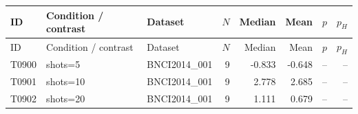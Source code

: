 \begin{longtable}{p{.45in}p{2.6in}p{.75in}rrrrr}
\toprule
ID & Condition / contrast & Dataset & $N$ & Median & Mean & $p$ & $p_H$ \\
\midrule
\endfirsthead
\toprule
ID & Condition / contrast & Dataset & $N$ & Median & Mean & $p$ & $p_H$ \\
\midrule
\endhead
T0900 & shots=5 & BNCI2014\_\allowbreak{}001 & 9 & -0.833 & -0.648 & -- & -- \\
T0901 & shots=10 & BNCI2014\_\allowbreak{}001 & 9 & 2.778 & 2.685 & -- & -- \\
T0902 & shots=20 & BNCI2014\_\allowbreak{}001 & 9 & 1.111 & 0.679 & -- & -- \\
\bottomrule
\end{longtable}
